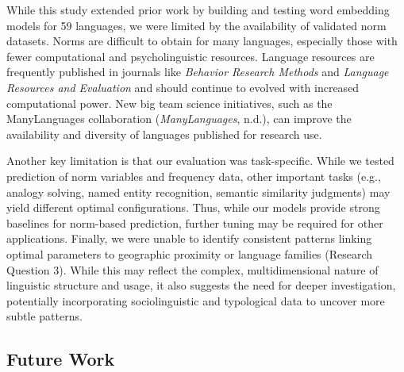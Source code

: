 \documentclass[
  english,
  man,floatsintext]{apa6}
\begin{document}
While this study extended prior work by building and testing word embedding models for 59 languages, we were limited by the availability of validated norm datasets. Norms are difficult to obtain for many languages, especially those with fewer computational and psycholinguistic resources. Language resources are frequently published in journals like \emph{Behavior Research Methods} and \emph{Language Resources and Evaluation} and should continue to evolved with increased computational power. New big team science initiatives, such as the ManyLanguages collaboration (\emph{ManyLanguages}, n.d.), can improve the availability and diversity of languages published for research use.

Another key limitation is that our evaluation was task-specific. While we tested prediction of norm variables and frequency data, other important tasks (e.g., analogy solving, named entity recognition, semantic similarity judgments) may yield different optimal configurations. Thus, while our models provide strong baselines for norm-based prediction, further tuning may be required for other applications. Finally, we were unable to identify consistent patterns linking optimal parameters to geographic proximity or language families (Research Question 3). While this may reflect the complex, multidimensional nature of linguistic structure and usage, it also suggests the need for deeper investigation, potentially incorporating sociolinguistic and typological data to uncover more subtle patterns.

\subsection{Future Work}\label{future-work}
\end{document}
